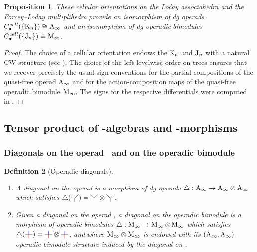 \documentclass[twoside, 11pt]{amsart}
\newtheorem{definition}{Definition}[section]
\newtheorem{proposition}[definition]{Proposition}
\theoremstyle{remark}
\begin{document}
\begin{proposition} 
\label{prop:cellular-chains}
These cellular orientations on the Loday associahedra and the Forcey--Loday multiplihedra provide an isomorphism of dg operads $C_\bullet^{cell}(\{\mathrm{K}_n\})\cong \mathrm{A}_\infty$ and an isomorphism of dg operadic bimodules $C_\bullet^{cell}(\{\mathrm{J}_n\})\cong \mathrm{M}_\infty$. 
\end{proposition}

\begin{proof}
The choice of a cellular orientation endows the $\mathrm{K}_n$ and $\mathrm{J}_n$ with a natural CW structure (see \cite[Proposition 4.22]{LA21}).
The choice of the left-levelwise order on trees ensures that we recover precisely the usual sign conventions for the partial compositions of the quasi-free operad $\mathrm{A}_\infty$ and for the action-composition maps of the quasi-free operadic bimodule $\mathrm{M}_\infty$. 
The signs for the respecive differentials were computed in \cite[Section 1.4]{mazuir-I}.
\end{proof}

\subsection{Tensor product of \Ainf -algebras and \Ainf -morphisms}

\subsubsection{Diagonals on the operad \Ainf\ and on the operadic bimodule \Minf}

\begin{definition}[Operadic diagonals] $ $
\begin{enumerate}[leftmargin=*]
    \item A \emph{diagonal on the operad \Ainf} is a morphism of dg operads $\triangle : \mathrm{A}_\infty \rightarrow \mathrm{A}_\infty \otimes \mathrm{A}_\infty$ which satisfies $\triangle (\arbreopdeux) = \arbreopdeux \otimes \arbreopdeux$. 
    \item Given a diagonal on the operad \Ainf, a \emph{diagonal on the operadic bimodule \Minf} is a morphism of operadic bimodules $\triangle : \mathrm{M}_\infty \rightarrow \mathrm{M}_\infty \otimes \mathrm{M}_\infty$ which satisfies $\triangle ( \arbreopunmorph ) = \arbreopunmorph \otimes \arbreopunmorph$, and where $\mathrm{M}_\infty \otimes \mathrm{M}_\infty$ is endowed with its $(\mathrm{A}_\infty , \mathrm{A}_\infty)$-operadic bimodule structure induced by the diagonal on \Ainf .
\end{enumerate}
\end{definition}
\end{document}
